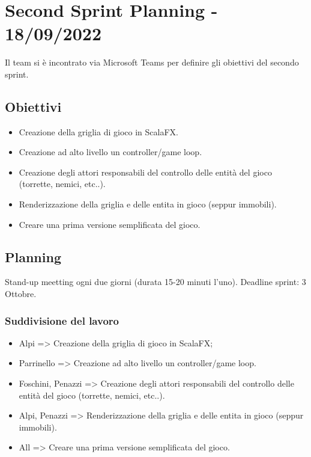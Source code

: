 \section*{Second Sprint Planning - 18/09/2022}
Il team si è incontrato via Microsoft Teams per definire gli obiettivi del secondo sprint.

\subsection*{Obiettivi}
\begin{itemize}
  \item Creazione della griglia di gioco in ScalaFX.
  \item Creazione ad alto livello un controller/game loop.
  \item Creazione degli attori responsabili del controllo delle entità del gioco (torrette, nemici, etc..).
  \item Renderizzazione della griglia e delle entita in gioco (seppur immobili).
  \item Creare una prima versione semplificata del gioco.
\end{itemize}

\subsection*{Planning}
Stand-up meetting ogni due giorni (durata 15-20 minuti l'uno).
Deadline sprint: 3 Ottobre.

\subsubsection*{Suddivisione del lavoro}
\begin{itemize}
  \item Alpi => Creazione della griglia di gioco in ScalaFX;
  \item Parrinello => Creazione ad alto livello un controller/game loop.
  \item Foschini, Penazzi => Creazione degli attori responsabili del controllo delle entità del gioco (torrette, nemici, etc..).
  \item Alpi, Penazzi => Renderizzazione della griglia e delle entita in gioco (seppur immobili).
  \item All => Creare una prima versione semplificata del gioco.
\end{itemize}

